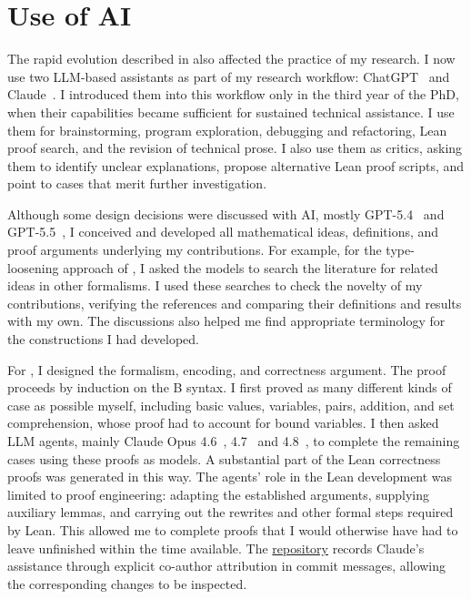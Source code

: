 \section{Use of AI}
\label{sec:intro-llm-use}

The rapid evolution described in  also affected the
practice of my research. I now use two LLM-based assistants as part of my
research workflow: ChatGPT~\cite{openai2022chatgpt} and
Claude~\cite{anthropic2023claude}. I introduced them into this workflow only in
the third year of the PhD, when their capabilities became sufficient for
sustained technical assistance. I use them for brainstorming, program
exploration, debugging and refactoring, Lean proof search, and the revision of
technical prose. I also use them as critics, asking them to identify unclear
explanations, propose alternative Lean proof scripts, and point to cases that
merit further investigation.

Although some design decisions were discussed with AI, mostly
GPT-5.4~\cite{openaiGPT54} and GPT-5.5~\cite{openaiGPT55}, I conceived and developed all
mathematical ideas, definitions, and proof arguments underlying my
contributions. For example, for the type-loosening approach of
, I asked the models to search the literature for related
ideas in other formalisms. I used these searches to check the novelty of my
contributions, verifying the references and comparing their definitions and
results with my own. The discussions also helped me find appropriate
terminology for the constructions I had developed.

For \beer{}, I designed the formalism, encoding, and correctness argument.
The proof proceeds by induction on the B syntax. I first proved as many
different kinds of case as possible myself, including basic values, variables,
pairs, addition, and set comprehension, whose proof had to account for bound
variables. I then asked LLM agents, mainly Claude Opus
4.6~\cite{anthropicClaudeOpus46}, 4.7~\cite{anthropicClaudeOpus47} and
4.8~\cite{anthropicClaudeOpus48}, to complete the remaining cases using these
proofs as models. A substantial part of the Lean correctness proofs was
generated in this way. The agents' role in the Lean development was limited
to proof engineering: adapting the established arguments, supplying auxiliary
lemmas, and carrying out the rewrites and other formal steps required by Lean.
This allowed me to complete proofs that I would otherwise have had to leave
unfinished within the time available. The
\href{https://github.com/VTrelat/BEer}{\beer{} repository} records Claude's
assistance through explicit co-author attribution in commit messages, allowing
the corresponding changes to be inspected.

